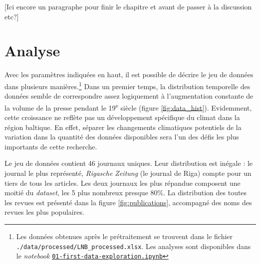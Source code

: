 \documentclass[a4paper,twoside,12pt]{article}
\begin{document}
[Ici encore un paragraphe pour finir le chapitre et avant de passer à la discussion etc?]



























\clearpage
\clearpage

\section{Analyse}

Avec les paramètres indiquées en haut, il est possible de décrire le jeu de données dans plusieurs manières.\footnote{Les données obtenues après le prétraitement se trouvent dans le fichier \texttt{./data/processed/LNB\_processed.xlsx}. Les analyses sont disponibles dans le \textit{notebook} \href{https://github.com/krkryger/clim-dist/blob/main/notebooks/01-first-data-exploration.ipynb}{\texttt{01-first-data-exploration.ipynb}}} Dans un premier temps, la distribution temporelle des données semble de correspondre assez logiquement à l'augmentation constante de la volume de la presse pendant le 19\textsuperscript{e} siècle (figure \ref{fig:data_hist}). Evidemment, cette croissance ne reflète pas un développement spécifique du climat dans la région baltique. En effet, séparer les changements climatiques potentiels de la variation dans la quantité des données disponibles sera l'un des défis les plus importants de cette recherche.


Le jeu de données contient 46 journaux uniques. Leur distribution est inégale : le journal le plus représenté, \textit{Rigasche Zeitung} (le journal de Riga) compte pour un tiers de tous les articles. Les deux journaux les plus répandue composent une moitié du \textit{dataset}, les 5 plus nombreux presque 80\%. La distribution des toutes les revues est présenté dans la figure \ref{fig:publications}, accompagné des noms des revues les plus populaires.
\end{document}
